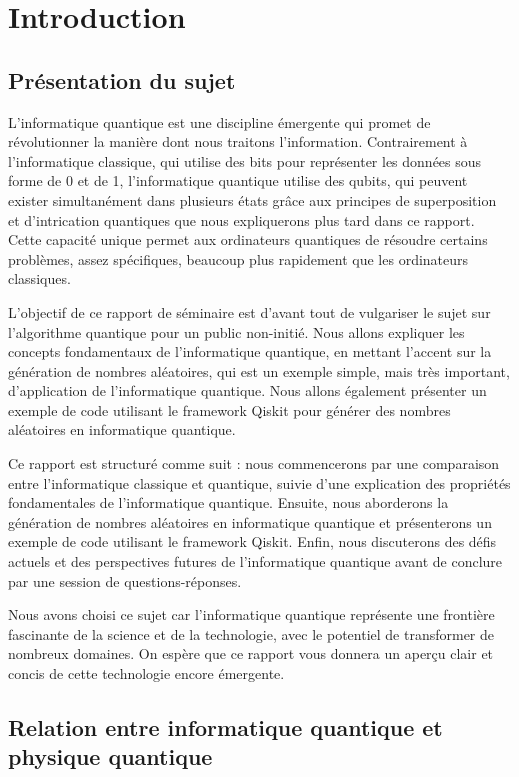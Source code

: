 \documentclass{article}
\begin{document}
\break\section{Introduction}
\subsection{Présentation du sujet}

L'informatique quantique est une discipline émergente qui promet de \\révolutionner la manière dont nous traitons l'information. Contrairement à l'informatique classique, qui utilise des bits pour représenter les données sous forme de 0 et de 1, l'informatique quantique utilise des qubits, qui peuvent exister simultanément dans plusieurs états grâce aux principes de superposition et d'intrication quantiques que nous expliquerons plus tard dans ce rapport. Cette capacité unique permet aux ordinateurs quantiques de résoudre certains problèmes, assez spécifiques, beaucoup plus rapidement que les ordinateurs classiques.

L'objectif de ce rapport de séminaire est d'avant tout de vulgariser le sujet sur l'algorithme quantique pour un public non-initié. Nous allons expliquer les concepts fondamentaux de l'informatique quantique, en mettant l'accent sur la génération de nombres aléatoires, qui est un exemple simple, mais très important, d'application de l'informatique quantique. Nous allons également présenter un exemple de code utilisant le framework Qiskit pour générer des nombres aléatoires en informatique quantique.

Ce rapport est structuré comme suit : nous commencerons par une comparaison entre l'informatique classique et quantique, suivie d'une explication des propriétés fondamentales de l'informatique quantique. Ensuite, nous aborderons la génération de nombres aléatoires en informatique quantique et présenterons un exemple de code utilisant le framework Qiskit. Enfin, nous discuterons des défis actuels et des perspectives futures de l'informatique quantique avant de conclure par une session de questions-réponses.

Nous avons choisi ce sujet car l'informatique quantique représente une frontière fascinante de la science et de la technologie, avec le potentiel de transformer de nombreux domaines. On espère que ce rapport vous donnera un aperçu clair et concis de cette technologie encore émergente.

\subsection{Relation entre informatique quantique et physique quantique}
\end{document}
